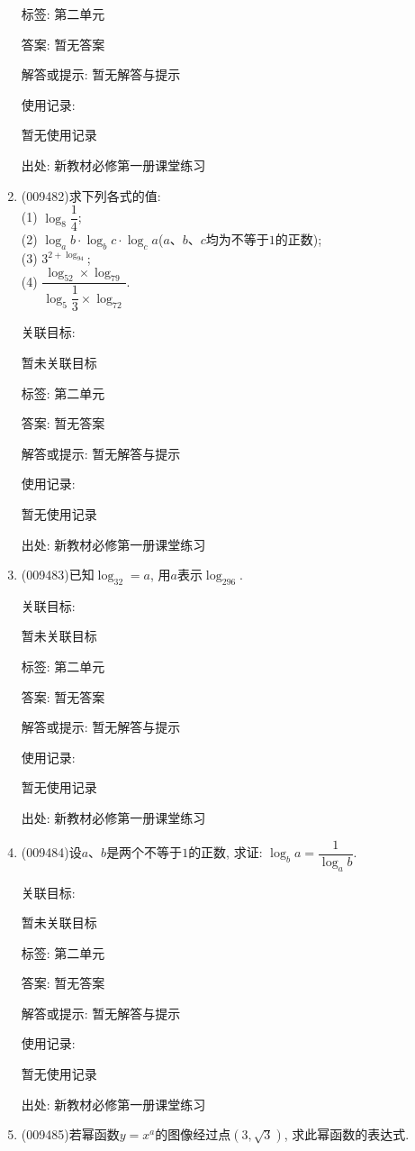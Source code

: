 \documentclass[10pt,a4paper]{article}
\begin{document}
\begin{enumerate}[1.]
标签: 第二单元

答案: 暂无答案

解答或提示: 暂无解答与提示

使用记录:

暂无使用记录


出处: 新教材必修第一册课堂练习
\item { (009482)}求下列各式的值:\\
(1) $\log_8\dfrac 14$;\\
(2) $\log_ab\cdot\log_bc\cdot\log_ca$($a$、$b$、$c$均为不等于$1$的正数);\\
(3) $3^{2+\log_94}$;\\
(4) $\dfrac{\log_52\times\log_79}{\log_5\dfrac 13\times\log_72}$.


关联目标:

暂未关联目标



标签: 第二单元

答案: 暂无答案

解答或提示: 暂无解答与提示

使用记录:

暂无使用记录


出处: 新教材必修第一册课堂练习
\item { (009483)}已知$\log_32=a$, 用$a$表示$\log_296$.


关联目标:

暂未关联目标



标签: 第二单元

答案: 暂无答案

解答或提示: 暂无解答与提示

使用记录:

暂无使用记录


出处: 新教材必修第一册课堂练习
\item { (009484)}设$a$、$b$是两个不等于$1$的正数, 求证: $\log_ba=\dfrac1{\log_ab}$.


关联目标:

暂未关联目标



标签: 第二单元

答案: 暂无答案

解答或提示: 暂无解答与提示

使用记录:

暂无使用记录


出处: 新教材必修第一册课堂练习
\item { (009485)}若幂函数$y=x^a$的图像经过点$(3, \sqrt 3)$, 求此幂函数的表达式.



\end{enumerate}
\end{document}
